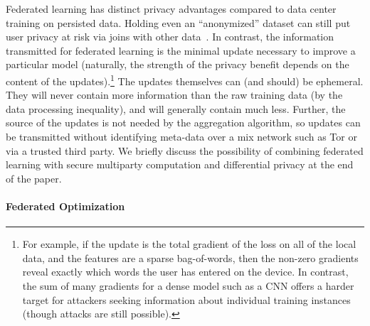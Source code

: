 \documentclass[twoside]{article}
\newcommand{\noaistats}[1]{}  %
\newcommand{\BO}{\mathcal{O}}
\begin{document}
Federated learning has distinct privacy advantages compared to data
center training on persisted data. Holding even an ``anonymized''
dataset can still put user privacy at risk via joins with other
data~\citep{sweeney00simple}. In contrast, the information transmitted
for federated learning is the minimal update necessary to improve a
particular model (naturally, the strength of the privacy benefit
depends on the content of the updates).\footnote{ For example, if the
  update is the total gradient of the loss on all of the local data,
  and the features are a sparse bag-of-words, then the non-zero
  gradients reveal exactly which words the user has entered on the
  device. In contrast, the sum of many gradients for a dense model
  such as a CNN offers a harder target for attackers seeking
  information about individual training instances (though attacks are
  still possible).} The updates themselves can (and should) be
ephemeral. They will never contain more information than the raw
training data (by the data processing inequality), and will generally
contain much less. Further, the source of the updates is not needed by
the aggregation algorithm, so updates can be transmitted without
identifying meta-data over a mix network such as Tor
\citep{chaum81untraceable} or via a trusted third party.
We briefly discuss the possibility of combining federated learning
with secure multiparty computation and differential privacy at the
end of the paper.





\noaistats{\paragraph{Advantages for large datasets}
Federated learning can also provide a distinct advantage when training
on large volumes of data. The network traffic per-client necessary to
train in the data center is simply the size of a client's local
dataset, which must be transmitted once; for federated learning, the
per-client traffic is
$(\text{\#-communication-rounds})\times(\text{update-size})$. This
latter quantity can be substantially smaller if the update-size
(generally $\BO(\text{\#-model-parameters})$) is relatively small
compared to the volume of training data needed, as when training on high-resolution photos or videos.}

\paragraph{Federated Optimization} %
\end{document}
